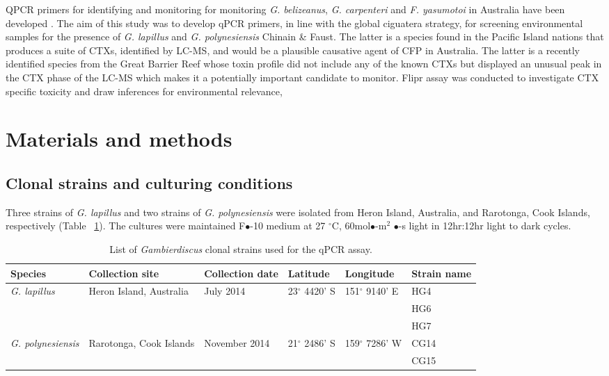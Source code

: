 \documentclass[12pt]{article}
\begin{document}
QPCR primers for identifying and monitoring for monitoring \emph{G. belizeanus}, \emph{G. carpenteri} and \emph{F. yasumotoi} in Australia have been developed \citep{nishimura2016quantitative,vandersea2012development}.
The aim of this study was to develop qPCR primers, in line with the global ciguatera strategy, for screening environmental samples for the presence of \emph{G. lapillus} and \emph{G. polynesiensis} Chinain \& Faust. The latter is a species found in the Pacific Island nations that produces a suite of CTXs, identified by LC-MS, and would be a plausible causative agent of CFP in Australia. The latter is a recently identified species from the Great Barrier Reef whose toxin profile did not include any of the known CTXs but displayed an unusual peak in the CTX phase of the LC-MS which makes it a potentially important candidate to monitor. Flipr assay was conducted to investigate CTX specific toxicity and draw inferences for environmental relevance,
\newpage
\section{Materials and methods}
\subsection{Clonal strains and culturing conditions}
Three strains of \emph{G. lapillus} and two strains of \emph{G. polynesiensis} were isolated from Heron Island, Australia, and Rarotonga, Cook Islands, respectively (Table ~\ref{tbl:StrainTable}). The cultures were maintained F$\bullet$-10 medium at 27 $^{\circ}$C, 60mol$\bullet$-m$^{2}$ $\bullet$-s light in 12hr:12hr light to dark cycles.
\FloatBarrier
\begin{table}
\caption{List of \emph{Gambierdiscus} clonal strains used for the qPCR assay.}
\label{tbl:StrainTable}
\begin{tabular}{ | p{2cm} | p{2cm} | p{2cm}| p{3cm} | p{3cm} | p{2cm} | }
\hline
\textbf{Species} & \textbf{Collection site} & \textbf{Collection date} &\textbf{Latitude} & \textbf{Longitude} & \textbf{Strain name} \\
\hline
\emph{G. lapillus} &Heron Island, Australia &July 2014 &23$^{\circ}$ 4420' S&151$^{\circ}$ 9140' E & HG4 \\
\hline
&&&&& HG6\\
\hline
&&&& &HG7\\
\hline
\emph{G. polynesiensis}&Rarotonga, Cook Islands&November 2014 &21$^{\circ}$ 2486' S&159$^{\circ}$ 7286' W & CG14 \\
\hline
&&&&&CG15\\
\hline
\end{tabular}
\end{table}
\end{document}
